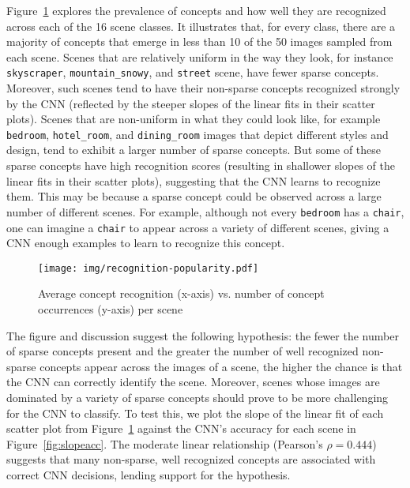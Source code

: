 \documentclass{article}
\begin{document}
Figure~\ref{fig:recpop} explores the prevalence of concepts and how well they are recognized 
across each of the 16 scene classes. 
It illustrates that, for every class, there are a majority of concepts that emerge in less
than 10 of the 50 images sampled from each scene. Scenes that are relatively uniform in the way they look,
for instance \texttt{skyscraper}, \texttt{mountain\_snowy}, and \texttt{street} scene, have fewer 
sparse concepts. Moreover, such scenes tend to have their non-sparse
concepts recognized strongly by the CNN (reflected by the steeper 
slopes of the linear fits in their scatter plots). Scenes that are non-uniform in what they could look like,
for example \texttt{bedroom}, \texttt{hotel\_room}, and \texttt{dining\_room} images
that depict different styles and design, tend to exhibit a larger number of sparse concepts. 
But some of these sparse concepts have 
high recognition scores (resulting in shallower slopes of the linear fits in their scatter plots), suggesting 
that the CNN learns to recognize them. This may be because 
a sparse concept could be observed across a large number of different scenes. For example,
although not every \texttt{bedroom} has a \texttt{chair}, one can imagine a \texttt{chair} 
to appear across a variety of different scenes, giving a CNN enough examples to learn to recognize 
this concept. 

\begin{figure}[h]
  \texttt{[image: img/recognition-popularity.pdf]}
   \caption{Average concept recognition (x-axis) vs. number of concept occurrences 
  (y-axis) per scene }
  \label{fig:recpop}
\end{figure}

The figure and discussion suggest the following hypothesis:
the fewer the number of sparse concepts present and the 
greater the number of well recognized non-sparse concepts appear across the images of a scene, the higher the chance is that the CNN can correctly identify the scene. Moreover, scenes whose images are 
dominated by a variety of sparse concepts should prove to be more challenging for the CNN to classify.
To test this, we plot 
the slope of the linear fit of each scatter plot from Figure~\ref{fig:recpop} against the CNN's 
accuracy for each scene in Figure~\ref{fig:slopeacc}. The
moderate linear relationship (Pearson's $\rho = 0.444$) suggests that many non-sparse, well recognized
concepts are associated with correct CNN decisions, lending support for the hypothesis.
\end{document}
